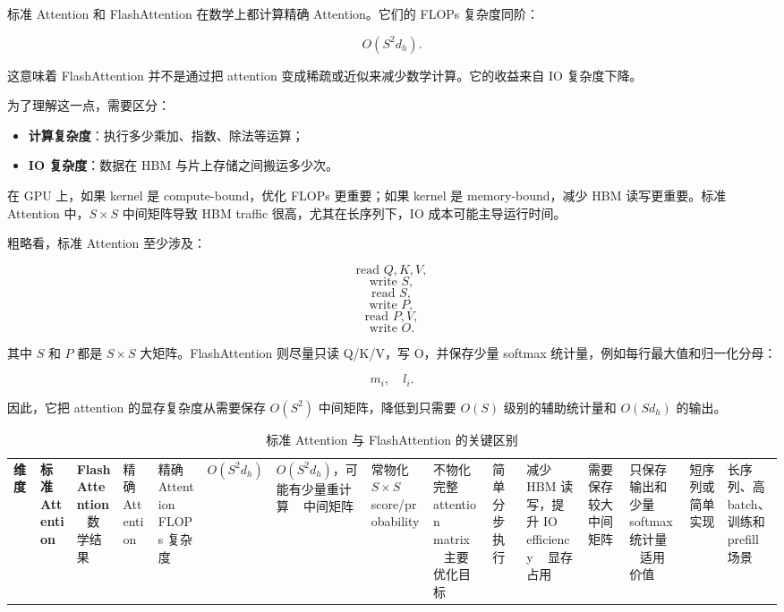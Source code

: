 标准 Attention 和 FlashAttention 在数学上都计算精确 Attention。它们的 FLOPs 复杂度同阶：

\[
O(S^2d_h).
\]

这意味着 FlashAttention 并不是通过把 attention 变成稀疏或近似来减少数学计算。它的收益来自 IO 复杂度下降。

为了理解这一点，需要区分：

\begin{itemize}
\item \textbf{计算复杂度}：执行多少乘加、指数、除法等运算；
\item \textbf{IO 复杂度}：数据在 HBM 与片上存储之间搬运多少次。
\end{itemize}

在 GPU 上，如果 kernel 是 compute-bound，优化 FLOPs 更重要；如果 kernel 是 memory-bound，减少 HBM 读写更重要。标准 Attention 中，$S\times S$ 中间矩阵导致 HBM traffic 很高，尤其在长序列下，IO 成本可能主导运行时间。

粗略看，标准 Attention 至少涉及：

\[
\text{read }Q,K,V,
\]
\[
\text{write }S,
\]
\[
\text{read }S,
\]
\[
\text{write }P,
\]
\[
\text{read }P,V,
\]
\[
\text{write }O.
\]

其中 $S$ 和 $P$ 都是 $S\times S$ 大矩阵。FlashAttention 则尽量只读 Q/K/V，写 O，并保存少量 softmax 统计量，例如每行最大值和归一化分母：

\[
m_i,\quad l_i.
\]

因此，它把 attention 的显存复杂度从需要保存 $O(S^2)$ 中间矩阵，降低到只需要 $O(S)$ 级别的辅助统计量和 $O(Sd_h)$ 的输出。

\begin{table}[H]
\centering
\small
\caption{标准 Attention 与 FlashAttention 的关键区别}
\label{tab:standard-vs-flash-attention}
\begin{tabular}{p{}p{}p{}}
\toprule
\textbf{维度} & \textbf{标准 Attention} & \textbf{FlashAttention} \
\midrule
数学结果
& 精确 Attention
& 精确 Attention \
\midrule
FLOPs 复杂度
& $O(S^2d_h)$
& $O(S^2d_h)$，可能有少量重计算 \
\midrule
中间矩阵
& 常物化 $S\times S$ score/probability
& 不物化完整 attention matrix \
\midrule
主要优化目标
& 简单分步执行
& 减少 HBM 读写，提升 IO efficiency \
\midrule
显存占用
& 需要保存较大中间矩阵
& 只保存输出和少量 softmax 统计量 \
\midrule
适用价值
& 短序列或简单实现
& 长序列、高 batch、训练和 prefill 场景 \
\bottomrule
\end{tabular}
\end{table}

